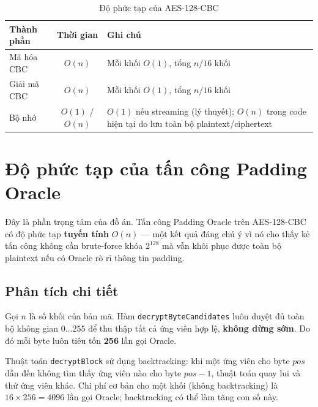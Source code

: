\begin{table}[htbp]
\centering
\caption{Độ phức tạp của AES-128-CBC}
\label{tab:cbc-cplx}
\begin{tabular}{@{}p{3cm}cp{7cm}@{}}
\toprule
\textbf{Thành phần} & \textbf{Thời gian} & \textbf{Ghi chú} \\
\midrule
Mã hóa CBC   & $O(n)$ & Mỗi khối $O(1)$, tổng $n/16$ khối \\
Giải mã CBC   & $O(n)$ & Mỗi khối $O(1)$, tổng $n/16$ khối \\
Bộ nhớ        & $O(1)$ / $O(n)$ & $O(1)$ nếu streaming (lý thuyết); $O(n)$ trong code hiện tại do lưu toàn bộ plaintext/ciphertext \\
\bottomrule
\end{tabular}
\end{table}

\section{Độ phức tạp của tấn công Padding Oracle}
\label{sec:cplx-oracle}

Đây là phần trọng tâm của đồ án. Tấn công Padding Oracle trên AES-128-CBC có độ phức tạp \textbf{tuyến tính} $O(n)$ --- một kết quả đáng chú ý vì nó cho thấy kẻ tấn công không cần brute-force khóa $2^{128}$ mà vẫn khôi phục được toàn bộ plaintext nếu có Oracle rò rỉ thông tin padding.

\subsection{Phân tích chi tiết}

Gọi $n$ là số khối của bản mã. Hàm \texttt{decryptByteCandidates} luôn duyệt đủ toàn bộ không gian $0\ldots255$ để thu thập tất cả ứng viên hợp lệ, \textbf{không dừng sớm}. Do đó mỗi byte luôn tiêu tốn \textbf{256} lần gọi Oracle.

Thuật toán \texttt{decryptBlock} sử dụng backtracking: khi một ứng viên cho byte $pos$ dẫn đến không tìm thấy ứng viên nào cho byte $pos-1$, thuật toán quay lui và thử ứng viên khác. Chi phí cơ bản cho một khối (không backtracking) là $16 \times 256 = 4096$ lần gọi Oracle; backtracking có thể làm tăng con số này.

